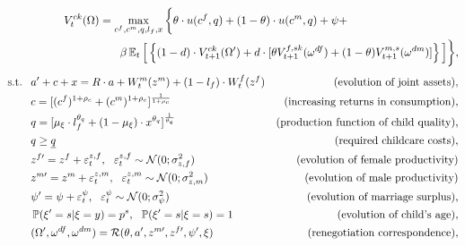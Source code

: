 \begin{align}& \hspace{5em}  V^{ck}_t(\Omega) = \max\limits_{c^f,c^m,q,l_f,x}  \bigg\{ \theta\cdot u(c^f,q) + (1-\theta)\cdot u(c^m,q) + \psi + \label{vf_ck} \\  \nonumber
 & \hspace{10em} \beta \E_t \Big[   \left\{ (1-d)\cdot   V^{ck}_{t+1}(\Omega') + d\cdot [ \theta V_{t+1}^{f,sk}(\omega^{df}) + (1-\theta)V_{t+1}^{m,s}(\omega^{dm})]\right\} \Big] \bigg\},
\end{align}\vspace{-2em}
\begin{align*}
\text{s.t. \ } & a' + c + x = R\cdot a  + W^m_t(z^m) + (1-l_f)\cdot W^f_t(z^f) & \text{(evolution of joint assets)},\\
                    & c = [(c^f)^{1+\rho_c} + (c^m)^{1+\rho_c}]^{\frac1{1+\rho_c}} & \text{(increasing returns in consumption)},\\
                    & q = [\mu_\xi\cdot l_f^{\theta_q} + (1-\mu_\xi)\cdot x^{\theta_q}]^{\frac1{\theta_q}} & \text{(production function of child quality)},\\
                    & q \geq \underline{q} & \text{(required childcare costs)},\\
                    &  z^{f\prime} = z^f + \varepsilon^{z,f}_t, \ \ \varepsilon^{z,f}_t \sim \mathcal{N}(0;\sigma_{z,f}^2) &  \text{ (evolution of female productivity)}\\
				 &  z^{m\prime} = z^m + \varepsilon^{z,m}_t, \ \ \varepsilon^{z,m}_t \sim \mathcal{N}(0;\sigma_{z,m}^2) &  \text{ (evolution of male productivity)}\\
                    & \psi' = \psi + \varepsilon^{\psi}_t, \ \ \varepsilon^{\psi}_t \sim \mathcal{N}(0;\sigma_{\psi}^2)  & \text{(evolution of marriage surplus),} \\
                   &  \P(\xi' = s | \xi = y) = p^s, \ \ \P(\xi' = s | \xi = s) = 1 & \text{(evolution of child's age)},\\
                    & (\Omega',\omega^{df},\omega^{dm}) = \mathcal{R}(\theta,a',z^{m\prime},z^{f\prime},\psi',\xi) & \text{(renegotiation correspondence)},
\end{align*}

